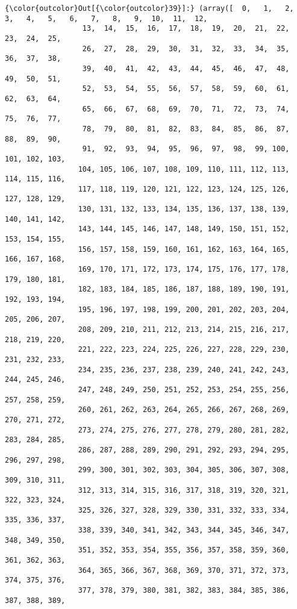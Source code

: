 \documentclass[11pt]{article}
\begin{document}
\begin{Verbatim}[commandchars=\\\{\}]
{\color{outcolor}Out[{\color{outcolor}39}]:} (array([  0,   1,   2,   3,   4,   5,   6,   7,   8,   9,  10,  11,  12,
                  13,  14,  15,  16,  17,  18,  19,  20,  21,  22,  23,  24,  25,
                  26,  27,  28,  29,  30,  31,  32,  33,  34,  35,  36,  37,  38,
                  39,  40,  41,  42,  43,  44,  45,  46,  47,  48,  49,  50,  51,
                  52,  53,  54,  55,  56,  57,  58,  59,  60,  61,  62,  63,  64,
                  65,  66,  67,  68,  69,  70,  71,  72,  73,  74,  75,  76,  77,
                  78,  79,  80,  81,  82,  83,  84,  85,  86,  87,  88,  89,  90,
                  91,  92,  93,  94,  95,  96,  97,  98,  99, 100, 101, 102, 103,
                 104, 105, 106, 107, 108, 109, 110, 111, 112, 113, 114, 115, 116,
                 117, 118, 119, 120, 121, 122, 123, 124, 125, 126, 127, 128, 129,
                 130, 131, 132, 133, 134, 135, 136, 137, 138, 139, 140, 141, 142,
                 143, 144, 145, 146, 147, 148, 149, 150, 151, 152, 153, 154, 155,
                 156, 157, 158, 159, 160, 161, 162, 163, 164, 165, 166, 167, 168,
                 169, 170, 171, 172, 173, 174, 175, 176, 177, 178, 179, 180, 181,
                 182, 183, 184, 185, 186, 187, 188, 189, 190, 191, 192, 193, 194,
                 195, 196, 197, 198, 199, 200, 201, 202, 203, 204, 205, 206, 207,
                 208, 209, 210, 211, 212, 213, 214, 215, 216, 217, 218, 219, 220,
                 221, 222, 223, 224, 225, 226, 227, 228, 229, 230, 231, 232, 233,
                 234, 235, 236, 237, 238, 239, 240, 241, 242, 243, 244, 245, 246,
                 247, 248, 249, 250, 251, 252, 253, 254, 255, 256, 257, 258, 259,
                 260, 261, 262, 263, 264, 265, 266, 267, 268, 269, 270, 271, 272,
                 273, 274, 275, 276, 277, 278, 279, 280, 281, 282, 283, 284, 285,
                 286, 287, 288, 289, 290, 291, 292, 293, 294, 295, 296, 297, 298,
                 299, 300, 301, 302, 303, 304, 305, 306, 307, 308, 309, 310, 311,
                 312, 313, 314, 315, 316, 317, 318, 319, 320, 321, 322, 323, 324,
                 325, 326, 327, 328, 329, 330, 331, 332, 333, 334, 335, 336, 337,
                 338, 339, 340, 341, 342, 343, 344, 345, 346, 347, 348, 349, 350,
                 351, 352, 353, 354, 355, 356, 357, 358, 359, 360, 361, 362, 363,
                 364, 365, 366, 367, 368, 369, 370, 371, 372, 373, 374, 375, 376,
                 377, 378, 379, 380, 381, 382, 383, 384, 385, 386, 387, 388, 389,

\end{Verbatim}
\end{document}
